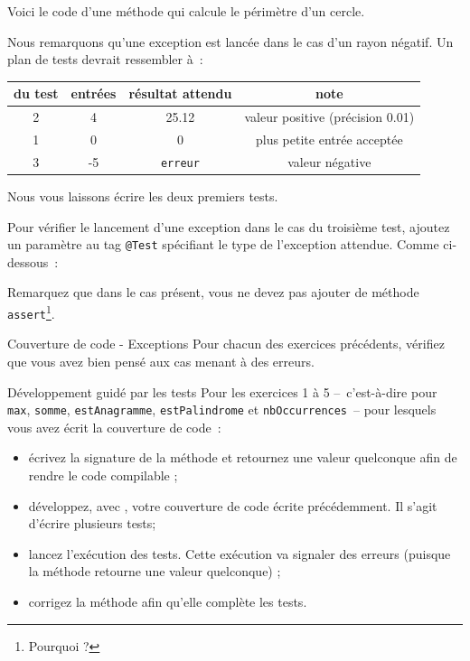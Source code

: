 \documentclass[a4paper,11pt]{style-esi/td}
\begin{document}
Voici le code d'une méthode qui calcule le périmètre d'un cercle.

Nous remarquons qu'une exception est lancée dans le cas d'un rayon négatif.
Un plan de tests devrait ressembler à~:

\begin{center}
	\begin{tabular}{|c|c|c|c|}
		\hline
		\no du test & entrées & résultat attendu & note                             \\
		\hline
		2           & 4       & 25.12            & valeur positive (précision 0.01) \\
		\hline
		1           & 0       & 0                & plus petite entrée acceptée      \\
		\hline
		3           & -5      & \texttt{erreur}  & valeur négative                  \\
		\hline
	\end{tabular}
\end{center}

Nous vous laissons écrire les deux premiers tests.

Pour vérifier le lancement d'une exception dans le cas du troisième test,
ajoutez un paramètre au tag \texttt{@Test}
spécifiant le type de l'exception attendue.
Comme ci-dessous~:


Remarquez que dans le cas présent, vous ne devez pas ajouter de méthode \texttt{assert}\footnote{Pourquoi ?}.

\begin{Exercice}{Couverture de code - Exceptions}
	Pour chacun des exercices précédents, 
	vérifiez que vous avez bien pensé aux cas menant à des erreurs.
\end{Exercice}

\begin{Exercice}{Développement guidé par les tests}
	Pour les exercices 1 à 5 
	--~c'est-à-dire pour 
	\texttt{max}, \texttt{somme}, \texttt{estAnagramme}, 
	\texttt{estPalindrome} et \texttt{nbOccurrences}~--
	pour lesquels vous avez écrit la couverture de code~:
	\begin{itemize}
		\item écrivez la signature de la méthode 
			et retournez une valeur quelconque afin de rendre le code compilable ;
		\item développez, avec , 
			votre couverture de code écrite précédemment. 
			Il s'agit d'écrire plusieurs tests;
		\item lancez l'exécution des tests. 
			Cette exécution va signaler des erreurs 
			(puisque la méthode retourne une valeur quelconque) ;
		\item corrigez la méthode afin qu'elle complète les tests.
	\end{itemize}
\end{Exercice}
\end{document}
